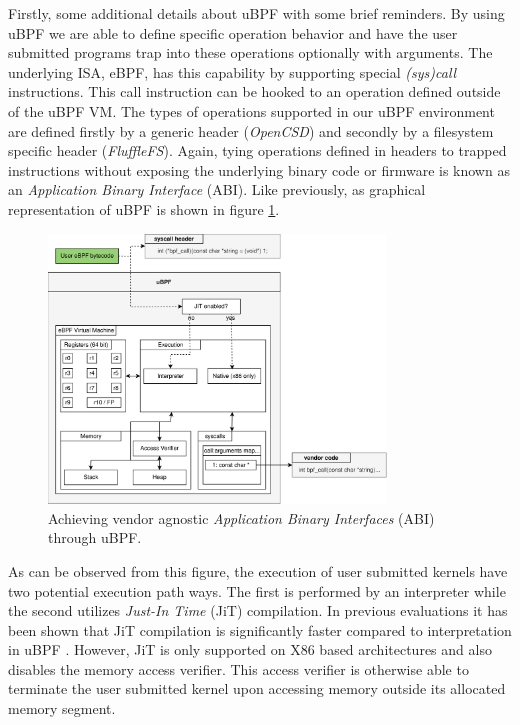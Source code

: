 \label{ubpfreuse}

Firstly, some additional details about uBPF with some brief reminders. By using
uBPF we are able to define specific operation behavior and have the user
submitted programs trap into these operations optionally with arguments. The
underlying ISA, eBPF, has this capability by supporting special
\textit{(sys)call} instructions. This call instruction can be hooked to an
operation defined outside of the uBPF VM. The types of operations supported in
our uBPF environment are defined firstly by a generic header (\textit{OpenCSD})
and secondly by a filesystem specific header (\textit{FluffleFS}). Again, tying
operations defined in headers to trapped instructions without exposing the
underlying binary code or firmware is known as an
\textit{Application Binary Interface} (ABI). Like previously, as graphical
representation of uBPF is shown in figure \ref{figure:ubpf-abi2}.

\begin{figure}
    \centering
	\includegraphics[width=0.8\textwidth]{resources/images/ubpf-abi.pdf}
	\caption{Achieving vendor agnostic \textit{Application Binary Interfaces}
        (ABI) through uBPF.}
    \label{figure:ubpf-abi2}
\end{figure}

As can be observed from this figure, the execution of user submitted kernels
have two potential execution path ways. The first is performed by an interpreter
while the second utilizes \textit{Just-In Time} (JiT) compilation. In previous
evaluations it has been shown that JiT compilation is significantly faster
compared to interpretation in uBPF \cite{lukken2021zcsd}. However, JiT is only
supported on X86 based architectures and also disables the memory access
verifier. This access verifier is otherwise able to terminate the user submitted
kernel upon accessing memory outside its allocated memory segment.


